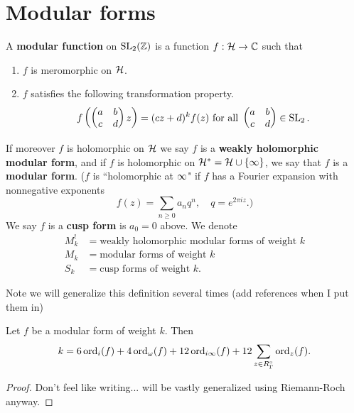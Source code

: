 \section{Modular forms}
\begin{df}
A \textbf{modular function} on $\SL_2(\Z)$ is a function $f:\cal H\to \C$ such that
\begin{enumerate}
\item $f$ is meromorphic on $\cal H$.
\item $f$ satisfies the following transformation property.
\[
f\pa{\matt abcd z}=(cz+d)^k f(z)\text{ for all }\matt abcd\in \SL_2.
\]
\end{enumerate}
If moreover $f$ is holomorphic on $\cal H$ we say $f$ is a 
\textbf{weakly holomorphic modular form}, and if $f$ is holomorphic on 
$\cal H^*=\cal H\cup \{\iy\}$, we say that $f$ is a \textbf{modular form}. ($f$ is ``holomorphic at $\iy$" if $f$ has a Fourier expansion with nonnegative exponents
\[
f(z)=\sum_{n\ge 0} a_nq^n,\quad q=e^{2\pi iz}.)
\]
We say $f$ is a \textbf{cusp form} is $a_0=0$ above. We denote
\begin{align*}
M_k^!&=\text{weakly holomorphic modular forms of weight }k\\
M_k&=\text{modular forms of weight }k\\
S_k&=\text{cusp forms of weight }k.
\end{align*}
\end{df}
Note we will generalize this definition several times (add references when I put them in)
\begin{thm}
Let $f$ be a modular form of weight $k$. Then 
\[
k=6\ord_i(f)+4\ord_{\om}(f)+12\ord_{i\iy}(f)
+12\sum_{z\in R_{\Ga}^{\circ}}\ord_{z}(f).
\]
\end{thm}
\begin{proof}
Don't feel like writing... will be vastly generalized using Riemann-Roch anyway.
\end{proof}
